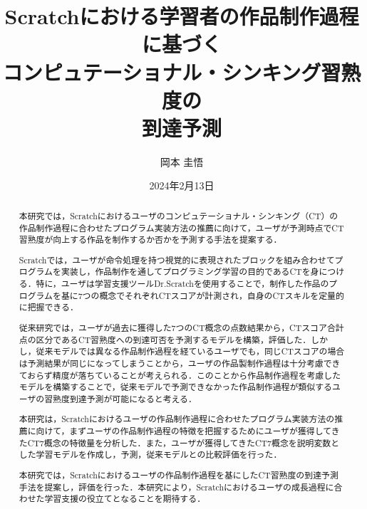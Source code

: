 \documentclass[11pt,dvipdfmx]{jreport}
\title{Scratchにおける学習者の作品制作過程に基づく\\
コンピュテーショナル・シンキング習熟度の\\
到達予測}
\author{岡本 圭悟}
\date{2024年2月13日}	%
\begin{document}
\maketitle

\begin{abstract}
本研究では，Scratchにおけるユーザのコンピュテーショナル・シンキング（CT）の作品制作過程に合わせたプログラム実装方法の推薦に向けて，ユーザが予測時点でCT習熟度が向上する作品を制作するか否かを予測する手法を提案する．

Scratchでは，ユーザが命令処理を持つ視覚的に表現されたブロックを組み合わせてプログラムを実装し，作品制作を通してプログラミング学習の目的であるCTを身につける．特に，ユーザは学習支援ツールDr.Scratchを使用することで，制作した作品のプログラムを基に7つの概念でそれぞれCTスコアが計測され，自身のCTスキルを定量的に把握できる．

従来研究では，ユーザが過去に獲得した7つのCT概念の点数結果から，CTスコア合計点の区分であるCT習熟度への到達可否を予測するモデルを構築，評価した．しかし，従来モデルでは異なる作品制作過程を経ているユーザでも，同じCTスコアの場合は予測結果が同じになってしまうことから，ユーザの作品製制作過程は十分考慮できておらず精度が落ちていることが考えられる．このことから作品制作過程を考慮したモデルを構築することで，従来モデルで予測できなかった作品制作過程が類似するユーザの習熟度到達予測が可能になると考える．

本研究は，Scratchにおけるユーザの作品制作過程に合わせたプログラム実装方法の推薦に向けて，まずユーザの作品制作過程の特徴を把握するためにユーザが獲得してきたCT7概念の特徴量を分析した．また，ユーザが獲得してきたCT7概念を説明変数とした学習モデルを作成し，予測，従来モデルとの比較評価を行った．

本研究では，Scratchにおけるユーザの作品制作過程を基にしたCT習熟度の到達予測手法を提案し，評価を行った．本研究により，Scratchにおけるユーザの成長過程に合わせた学習支援の役立てとなることを期待する．

\end{abstract}

\tableofcontents



\newpage
{}	%

\end{document}
